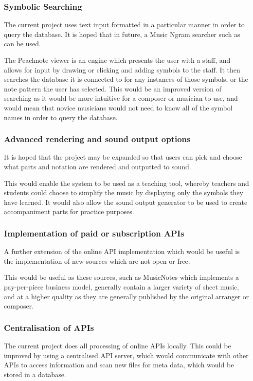 \subsubsection{Symbolic Searching}
The current project uses text input formatted in a particular manner in order to query the database. It is hoped that in future, a Music Ngram searcher such as \cite{Peachnote} can be used. 

The Peachnote viewer is an engine which presents the user with a staff, and allows for input by drawing or clicking and adding symbols to the staff. It then searches the database it is connected to for any instances of those symbols, or the note pattern the user has selected. This would be an improved version of searching as it would be more intuitive for a composer or musician to use, and would mean that novice musicians would not need to know all of the symbol names in order to query the database.


\subsubsection{Advanced rendering and sound output options}
It is hoped that the project may be expanded so that users can pick and choose what parts and notation are rendered and outputted to sound. 

This would enable the system to be used as a teaching tool, whereby teachers and students could choose to simplify the music by displaying only the symbols they have learned. It would also allow the sound output generator to be used to create accompaniment parts for practice purposes.

\subsubsection{Implementation of paid or subscription APIs}
A further extension of the online API implementation which would be useful is the implementation of new sources which are not open or free. 

This would be useful as these sources, such as MusicNotes which implements a pay-per-piece business model, generally contain a larger variety of sheet music, and at a higher quality as they are generally published by the original arranger or composer.

\subsubsection{Centralisation of APIs}
The current project does all processing of online APIs locally. This could be improved by using a centralised API server, which would communicate with other APIs to access information and scan new files for meta data, which would be stored in a database.

